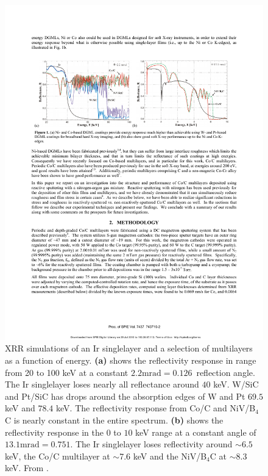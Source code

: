 \begin{figure}[!ht] %
	\centering	\includegraphics[width=\linewidth]{figures/introduction/xrayperformance.pdf}
	\caption{\footnotesize XRR simulations of an Ir singlelayer and a selection of multilayers as a function of energy. \textbf{(a)} shows the reflectivity response in range from 20 to 100 keV at a constant $2.2\text{mrad} = 0.126$\degr\ reflection angle. The Ir singlelayer loses nearly all reflectance around $40$ keV. W/SiC and Pt/SiC has drops around the absorption edges of W and Pt $69.5$ keV and $78.4$ keV. The reflectivity response from Co/C and NiV/B$_4$C is nearly constant in the entire spectrum. \textbf{(b)} shows the reflectivity response in the 0 to $10$ keV range at a constant angle of $13.1 \text{mrad} = 0.751$\degr. The Ir singlelayer loses reflectivity around $\sim 6.5$ keV, the Co/C multilayer at $\sim$7.6 keV and the NiV/B$_4$C at $\sim 8.3 $ keV. From \cite{Bellotti:2009dj}.}
	\label{fig:xrayperformance}
\end{figure}


